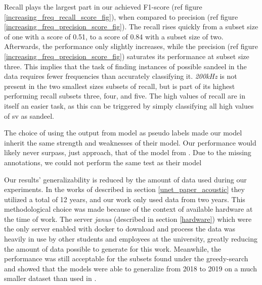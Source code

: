     Recall plays the largest part in our achieved F1-score (ref figure \ref{increasing_freq_recall_score_fig}), when compared to precision (ref figure \ref{increasing_freq_precision_score_fig}). The recall rises quickly from a subset size of one with a score of 0.51, to a score of 0.84 with a subset size of two. Afterwards, the performance  only slightly increases, while the precision (ref figure \ref{increasing_freq_precision_score_fig}) saturates its performance at subset size three. This implies that the task of finding instances of possible sandeel in the data requires fewer frequencies than accurately classifying it. \textit{200kHz} is not present in the two smallest sizes subsets of recall, but is part of its highest performing recall subsets three, four, and five. The high values of recall are in itself an easier task, as this can be triggered by simply classifying all high values of \gls{sv} as sandeel. 
    
    The choice of using the output from \citeauthor{brautaset2020acoustic} model as pseudo labels made our model inherit the same strength and weaknesses of their model. Our performance would likely never surpass, just approach, that of the model from \citeauthor{brautaset2020acoustic}. Due to the missing annotations, we could not perform the same test as their model 
    
    Our results' generalizability is reduced by the amount of data used during our experiments. In the works of \citeauthor{brautaset2020acoustic} described in section \ref{unet_paper_acoustic} they utilized a total of 12 years, and our work only used data from two years. This methodological choice was made because of the context of available hardware at the time of work. The server \textit{janus} (described in section \ref{hardware}) which were the only server enabled with docker to download and process the data was heavily in use by other students and employees at the university, greatly reducing the amount of data possible to generate for this work. Meanwhile, the performance was still acceptable for the subsets found under the greedy-search and showed that the models were able to generalize from 2018 to 2019 on a much smaller dataset than used in \citeauthor{brautaset2020acoustic}. 
    

    
    




